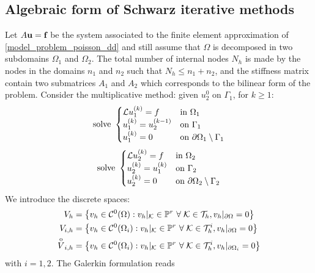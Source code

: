 \subsection{Algebraic form of Schwarz iterative methods}
Let \(A\textbf{u} = \textbf{f}\) be the system associated to the finite element approximation of \eqref{model_problem_poisson_dd} and still assume that \(\Omega\) is decomposed in two subdomains \(\Omega_1\) and \(\Omega_2\). The total number of internal nodes \(N_h\) is made by the nodes in the domains \(n_1\) and \(n_2\) such that \(N_h \leq n_1+n_2\), and the stiffness matrix contain two submatrices \(A_1\) and \(A_2\) which corresponds to the bilinear form of the problem.
Consider the multiplicative method: given \(u_2^0\) on \(\Gamma_1\), for \(k \geq 1\):
\begin{equation*}
    \text{solve }\begin{cases}
        \mathcal{L} u^{(k)}_1 = f & \text{in } \Omega_1 \\
        u^{(k)}_1 = u^{(k-1)}_2 & \text{on } \Gamma_1 \\
        u^{(k)}_1 = 0 & \text{on } {\partial\Omega}_1\setminus \Gamma_1
    \end{cases}
\end{equation*}
\begin{equation*}
    \text{solve }\begin{cases}
        \mathcal{L} u^{(k)}_2 = f & \text{in } \Omega_2 \\
        u^{(k)}_2 = u^{(k)}_1 & \text{on } \Gamma_2 \\
        u^{(k)}_2 = 0 & \text{on } {\partial\Omega}_2\setminus \Gamma_2
    \end{cases}
\end{equation*}
We introduce the discrete spaces: 
\begin{align*}
    V_h &= \left\{ v_h \in \mathcal{C}^0(\Omega) : v_h\limited{\element} \in \mathbb{P}^r \ \forall \; \element \in \triangulation, v_h\limited{\boundary} = 0 \right\} \\
    V_{i,h} &= \left\{ v_h \in \mathcal{C}^0(\Omega_i) : v_h\limited{\element} \in \mathbb{P}^r \ \forall \; \element \in \triangulation^i, v_h\limited{\boundary} = 0 \right\} \\
    \overset{\mathrm{o}}{V}_{i,h} &= \left\{ v_h \in \mathcal{C}^0(\Omega_i) : v_h\limited{\element} \in \mathbb{P}^r \ \forall \; \element \in \triangulation^i, v_h\limited{\boundary_i} = 0 \right\} \\
\end{align*}
with \(i = 1,2\). The Galerkin formulation reads 
